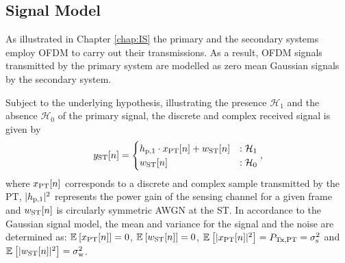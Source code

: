 

\subsection{Signal Model}
As illustrated in Chapter \ref{chap:IS} the primary and the secondary systems employ OFDM to carry out their transmissions. As a result, OFDM signals transmitted by the primary system are modelled as zero mean Gaussian signals by the secondary system. 

Subject to the underlying hypothesis, illustrating the presence $\mathcal H_1$ and the absence $\mathcal H_0$ of the primary signal, the discrete and complex received signal is given by 
\begin{equation}
y_{\text{ST}}[n] = 
\begin{cases}
h_{\text{p,1}} \cdot x_{\text{PT}}[n] + w_{\text{ST}}[n] & : \mathcal{H}_1 \\
w_{\text{ST}}[n] & :\mathcal{H}_0
\end{cases},
\label{eq_HS:sig_mod_st}
\end{equation}
where $x_{\text{PT}}[n]$ corresponds to a discrete and complex sample transmitted by the PT, $|h_{\text{p,1}}|^2$ represents the power gain of the sensing channel for a given frame and $w_{\text{ST}}[n]$ is circularly symmetric AWGN at the ST. 
In accordance to the Gaussian signal model, the mean and variance for the signal and the noise are determined as: ${\mathbb E}_{}\left[ x_{\text{PT}}[n] \right] = 0$, ${\mathbb E}_{}\left[ w_{\text{ST}}[n] \right] = 0$, ${\mathbb E}_{}\left[ |x_{\text{PT}}[n]|^2 \right] = P_{\text{Tx,PT}} = \sigma^2_{\text{s}}$ and ${\mathbb E}_{}\left[ |w_{\text{ST}}[n]|^2 \right] = \sigma^2_{\text{w}}$. 

